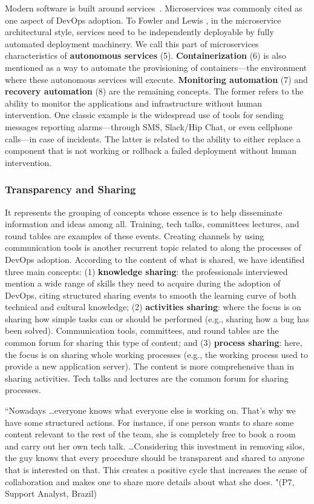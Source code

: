 Modern software is built around services~\cite{Luz:2018:SBES}. Microservices  was commonly cited
as one aspect of DevOps adoption. To Fowler and Lewis
\cite{martinfowler2014microservices}, in the
microservice architectural style, services need to be independently deployable
by fully automated deployment machinery. We call this part of microservices
characteristics of \textbf{autonomous services} (5). \textbf{Containerization}
(6) is also mentioned as a way to automate the provisioning of containers---the
environment where these autonomous services will execute.
\textbf{Monitoring automation} (7) and \textbf{recovery automation} (8) are the
remaining concepts. The former refers to the ability to monitor the
applications and infrastructure without human intervention. One classic example
is the widespread use of tools for sending messages reporting
alarms---through SMS, Slack/Hip Chat, or even
cellphone calls---in case of incidents. The latter is related to the ability
to either replace a component that is not working or
rollback a failed deployment without human intervention.

\subsubsection{Transparency and Sharing} It represents the grouping of concepts
whose essence is to help disseminate information and ideas among all. Training,
tech talks, committees lectures, and round tables
are examples of these events. Creating
channels by using communication tools is another recurrent topic
related to  along the processes of DevOps adoption.
According to the content of what is shared, we have identified three main concepts:
(1) {\bf knowledge sharing}: the professionals interviewed mention a wide range of
skills they need to acquire during the adoption of DevOps, citing
structured sharing events to smooth the learning curve of both technical and
cultural knowledge; (2) {\bf activities sharing}: where the focus is on sharing how simple tasks can or
should be performed (e.g., sharing how a bug has been solved). Communication tools,
committees, and round tables are the common forum for sharing this type of content;
and (3) {\bf process sharing}: here, the focus is on sharing whole working processes
(e.g., the working process used to provide a new application server). The
content is more comprehensive than in sharing activities. Tech talks and
lectures are the common forum for sharing processes.

\begin{mq}
``Nowadays \ldots everyone
knows what everyone else is working on. That's why we have some
structured actions. For instance, if one person wants to share some content
relevant to the rest of the team, she is completely free to book a room
and carry out her own tech talk. \ldots Considering this investment in removing
silos, the guy knows that every procedure should be transparent and shared
to anyone that is interested on that. 
This creates a positive cycle that increases the sense of collaboration
and makes one to share more details about what she does. "(P7, Support Analyst, Brazil)
\end{mq}

